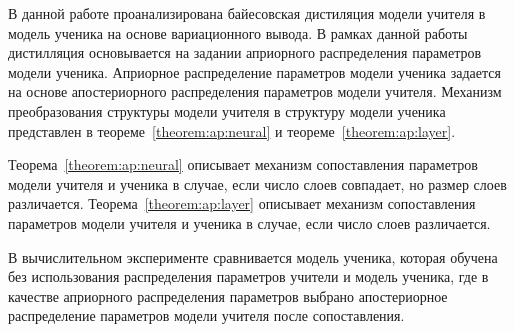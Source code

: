 \documentclass[12pt]{a&t}
\begin{document}
В данной работе проанализирована байесовская дистиляция модели учителя в модель ученика на основе вариационного вывода.
В рамках данной работы дистилляция основывается на задании априорного распределения параметров модели ученика.
Априорное распределение параметров модели ученика задается на основе апостериорного распределения параметров модели учителя.
Механизм преобразования структуры модели учителя в структуру модели ученика представлен в теореме~\ref{theorem:ap:neural} и теореме~\ref{theorem:ap:layer}.

Теорема~\ref{theorem:ap:neural} описывает механизм сопоставления параметров модели учителя и ученика в случае, если число слоев совпадает, но размер слоев различается. Теорема~\ref{theorem:ap:layer} описывает механизм сопоставления параметров модели учителя и ученика в случае, если число слоев различается.

В вычислительном эксперименте сравнивается модель ученика, которая обучена без использования распределения параметров учители и модель ученика, где в качестве априорного распределения параметров выбрано апостериорное распределение параметров модели учителя после сопоставления.
\end{document}
